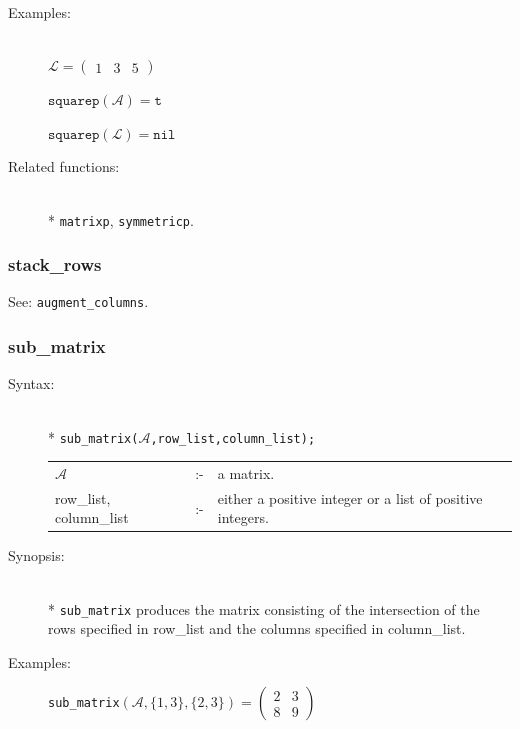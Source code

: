 {\begin{description}
\item[Examples:]\mbox{}\\
  \(\mathcal{L} = \begin{pmatrix} 1 & 3 & 5 \end{pmatrix}\)

  \(\texttt{squarep}(\mathcal{A}) = \texttt{t}\)

  \(\texttt{squarep}(\mathcal{L}) = \texttt{nil}\)

\item[Related functions:]\mbox{}\\*
\texttt{matrixp}, \texttt{symmetricp}.
\end{description}


\subsubsection{stack\_rows}
\label{linalg:stack_rows}
\hypertarget{operator:STACK_ROWS}{}

See: \texttt{augment\_columns}.


\subsubsection{sub\_matrix}
\label{linalg:sub_matrix}
\hypertarget{operator:SUB_MATRIX}{}

\begin{description}
\item[Syntax:]\mbox{}\\*
{\tt sub\_matrix($\mathcal{A}$,row\_list,column\_list);}\\[2mm]
\begin{tabular}{l l p{.605\linewidth}}
$\mathcal{A}$              &:-& a matrix. \\
row\_list, column\_list &:-& either a
positive integer or a list of positive integers.
\end{tabular}

\item[Synopsis:]\mbox{}\\*
\texttt{sub\_matrix} produces the matrix consisting of the
              intersection of the rows specified in row\_list and the
columns specified in column\_list.

\item[Examples:]
\begin{flushleft}
\texttt{sub\_matrix}\((\mathcal{A},\{1,3\},\{2,3\}) =
        \begin{pmatrix} 2 & 3 \\ 8 & 9 \end{pmatrix}\)
\end{flushleft}


\end{description}}
